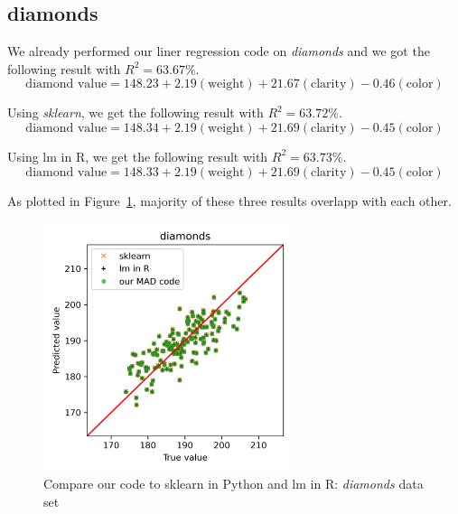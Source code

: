 \documentclass[
	letterpaper
]{article}
\begin{document}
\subsection{diamonds}
We already performed our liner regression code on \textit{diamonds} and we got the following result with $R^2 = 63.67\%$.
\begin{equation}
\text{diamond value} = 148.23+ 2.19 (\text{weight}) + 21.67(\text{clarity})-0.46(\text{color})
\end{equation}

Using \textit{sklearn}, we get the following result with $R^2 = 63.72\%$.
\begin{equation}
\text{diamond value} = 148.34 + 2.19 (\text{weight}) + 21.69(\text{clarity})-0.45(\text{color})
\end{equation}

Using lm in R, we get the following result with $R^2 = 63.73\%$.
\begin{equation}
\text{diamond value} = 148.33 + 2.19 (\text{weight}) + 21.69(\text{clarity})-0.45(\text{color})
\end{equation}

As plotted in Figure~\ref{fig:compare-diamonds}, majority of these three results overlapp with each other. 
\begin{figure}[htbp]
	\centering
	\includegraphics[width=0.65\textwidth]{figures/compare-diamonds.png}
	\caption{Compare our code to sklearn in Python and lm in R: \textit{diamonds} data set}
	\label{fig:compare-diamonds}
\end{figure}
\end{document}
